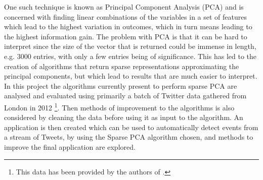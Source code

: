 \documentclass[11pt,a4paper]{article}
\begin{document}
One such technique is known as Principal Component Analysis (PCA) and is concerned with finding linear combinations of the variables in a set of features which lead to the highest variation in outcomes, which in turn means leading to the highest information gain. The problem with PCA is that it can be hard to interpret since the size of the vector that is returned could be immense in length, e.g. 3000 entries, with only a few entries being of significance. This has led to the creation of algorithms that return sparse representations approximating the principal components, but which lead to results that are much easier to interpret. In this project the algorithms currently present to perform sparse PCA are analysed and evaluated using primarily a batch of Twitter data gathered from London in 2012 \footnote{This data has been provided by the authors of \cite{microblogs}.}. Then methods of improvement to the algorithms is also considered by cleaning the data before using it as input to the algorithm. An application is then created which can be used to automatically detect events from a stream of Tweets, by using the Sparse PCA algorithm chosen, and methods to improve the final application are explored. 

\end{document}
